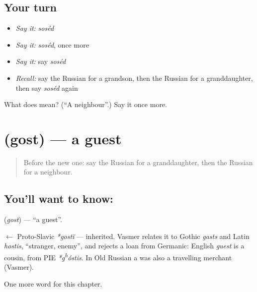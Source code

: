 \subsection*{Your turn}
\begin{itemize}
\raggedright
  \item \emph{Say it:} \emph{soséd}
  \item \emph{Say it:} \emph{soséd}, once more
  \item \emph{Say it:} say \emph{soséd}
  \item \emph{Recall:} say the Russian for a grandson, then the Russian for a granddaughter, then say \emph{soséd} again
\end{itemize}

\begin{tcolorbox}[breakable,colback=teal!4,colframe=teal!35!black,title={Before you move on}]
What does  mean? (\textquotedblleft{}A neighbour\textquotedblright{}.) Say it once more.
\end{tcolorbox}
\section[\texorpdfstring{\ru{гость} (gost)}{гость (gost)}]{ (gost) — a guest}

\label{lesson:RU-C37-guest}



\begin{quote}
Before the new one: say the Russian for a granddaughter, then the Russian for a neighbour.
\end{quote}

\subsection*{You'll want to know: }
\textbf{} (\emph{gost}) — \textquotedblleft{}a guest\textquotedblright{}.

\begin{cousinweb}
\textbf{} $\leftarrow$ Proto-Slavic \emph{*gostĭ} — inherited. Vasmer relates it to Gothic \emph{gasts} and Latin \emph{hostis}, \textquotedblleft{}stranger, enemy\textquotedblright{}, and rejects a loan from Germanic: English \emph{guest} is a cousin, from PIE \emph{*g\textsuperscript{h}óstis}. In Old Russian a \emph{} was also a travelling merchant (Vasmer).
\end{cousinweb}

\begin{grammarlens}[title={What you've built}]
One more word for this chapter.
\end{grammarlens}

